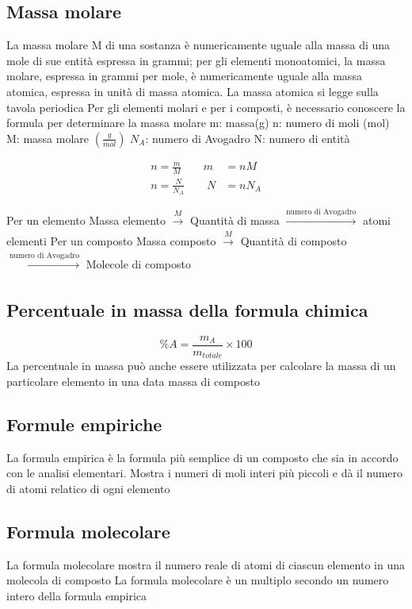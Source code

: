 \documentclass[a4paper,11pt]{report}
\begin{document}
\subsection*{Massa molare}
La massa molare M di una sostanza è numericamente uguale alla massa di una mole di sue entità espressa in grammi; per gli elementi monoatomici, la massa molare, espressa in grammi per mole, è numericamente uguale alla massa atomica, espressa in unità di massa atomica. La massa atomica si legge sulla tavola periodica \newline
Per gli elementi molari e per i composti, è necessario conoscere la formula per determinare la massa molare 
\noindent m: massa(g) \quad n: numero di moli (mol) \quad M: massa molare $\left(\frac{g}{mol}\right)$ \quad $N_A$: numero di Avogadro \newline 
N: numero di entità

\begin{align*}
	n = \frac{m}{M} \qquad  m &= nM \\
	n = \frac{N}{N_A} \qquad  N &= nN_A
\end{align*}

\noindent Per un elemento \qquad  Massa elemento $\xrightarrow[]{M}$ Quantità di massa $\xrightarrow[]{\text{numero di Avogadro}}$ atomi elementi \newline
Per un composto \qquad Massa composto $\xrightarrow[]{M}$ Quantità di composto $\xrightarrow[]{\text{numero di Avogadro}}$ Molecole di composto 

\subsection*{Percentuale in massa della formula chimica}
\[\% A = \frac{m_A}{m_{totale}} \times 100\]
La percentuale in massa può anche essere utilizzata per calcolare la massa di un particolare elemento in una data massa di composto

\subsection*{Formule empiriche}
La formula empirica è la formula più semplice di un composto che sia in accordo con le analisi elementari. Mostra i numeri di moli interi più piccoli e dà il numero di atomi relatico di ogni elemento

\subsection*{Formula molecolare}
La formula molecolare mostra il numero reale di atomi di ciascun elemento in una molecola di composto \newline
La formula molecolare è un multiplo secondo un numero intero della formula empirica 
\end{document}

